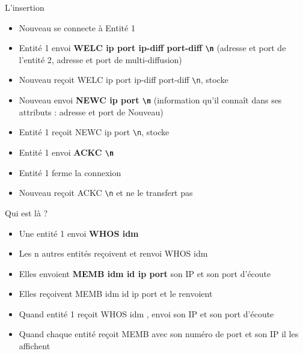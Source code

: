 \documentclass{beamer}
\newcommand*{\escape}[1]{\texttt{\textbackslash#1}}
\begin{document}
\begin{frame}{L'insertion}
	\begin{itemize}
		\item<2-6> Nouveau se connecte à Entité 1
		\item<3-6> Entité 1 envoi \textbf{WELC ip port ip-diff port-diff \escape{n}} (adresse et port de l’entité 2, adresse et port de multi-diffusion)
		\item<3-6> Nouveau reçoit WELC ip port ip-diff port-diff \escape{n}, stocke
		\item<4-6> Nouveau envoi \textbf{NEWC ip port \escape{n}} (information qu'il connaît dans ses attributs : adresse et port de Nouveau)
		\item<4-6> Entité 1 reçoit NEWC ip port \escape{n}, stocke
		\item<5-6> Entité 1 envoi \textbf{ACKC \escape{n}}
		\item<6-6> Entité 1 ferme la connexion
		\item<5-6> Nouveau reçoit ACKC \escape{n} et ne le transfert pas
	\end{itemize}
\end{frame}

\begin{frame}{Qui est là ?}
	\begin{itemize}
		\item<1-5> Une entité 1 envoi \textbf{WHOS idm}
		\item<2-5> Les n autres entités reçoivent et renvoi WHOS idm
		\item<2-5> Elles envoient \textbf{MEMB idm id ip port} son IP et son port d'écoute
		\item<3-5> Elles reçoivent MEMB idm id ip port et le renvoient
		\item<4-5> Quand entité 1 reçoit WHOS idm , envoi son IP et son port d'écoute
		\item<5-5> Quand chaque entité reçoit MEMB avec son numéro de port et son IP il les affichent
	\end{itemize}
\end{frame}
\end{document}
